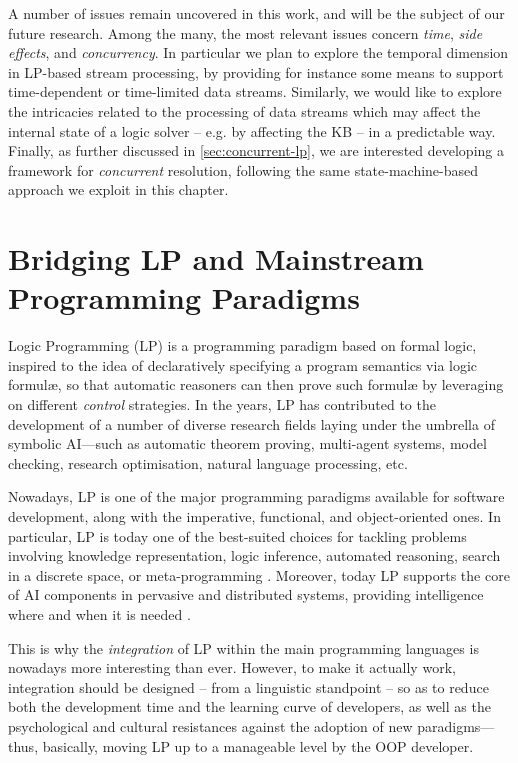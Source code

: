 \documentclass[12pt,a4paper,openright,twoside]{book}
\begin{document}
A number of issues remain uncovered in this work, and will be the subject of our future research.
%
Among the many, the most relevant issues concern \emph{time}, \emph{side effects}, and \emph{concurrency}.
%
In particular we plan to explore the temporal dimension in LP-based stream processing, by providing for instance some means to support time-dependent or time-limited data streams.
%
Similarly, we would like to explore the intricacies related to the processing of data streams which may affect the internal state of a logic solver -- e.g. by affecting the KB -- in a predictable way.
%
Finally, as further discussed in \cref{sec:concurrent-lp}, we are interested developing a framework for \emph{concurrent} resolution, following the same state-machine-based approach we exploit in this chapter.

\chapter{Bridging LP and Mainstream Programming Paradigms}


Logic Programming (LP) \cite{Apt2001,Kowalski1974} is a programming pa\-ra\-di\-gm based on formal logic, inspired to the idea of declaratively specifying a program semantics via logic formul\ae{}, so that automatic reasoners can then prove such formul\ae{} by leveraging on different \emph{control} strategies.
%
In the years, LP has contributed to the development of a number of diverse research fields laying under the umbrella of symbolic AI---such as automatic theorem proving, multi-agent systems, model checking, research optimisation, natural language processing, etc.

Nowadays, LP is one of the major programming pa\-ra\-di\-gms available for software development, along with the imperative, functional, and object-oriented ones.
%
In particular, LP is today one of the best-suited choices for tackling problems involving knowledge representation, logic inference, automated reasoning, search in a discrete space, or meta-programming \cite{logictech-information11}.
%
Moreover, today LP supports the core of AI components in pervasive and distributed systems, providing intelligence where and when it is needed \cite{microintelligencelp-mmasII}.

This is why the \emph{integration} of LP within the main programming languages is  nowadays more interesting than ever.
%
However, to make it actually work, integration should be designed -- from a linguistic standpoint -- so as to reduce both the development time and the learning curve of developers, as well as the psychological and cultural resistances against the adoption of new paradigms---thus, basically, moving LP up to a manageable level by the OOP developer.
\end{document}
